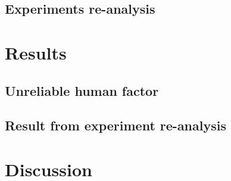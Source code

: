 \documentclass[english]{article}
\begin{document}
\subsection{Experiments re-analysis}

\section{Results}

\subsection{Unreliable human factor}

\subsection{Result from experiment re-analysis}

\section{Discussion}

\printbibliography
\end{document}
